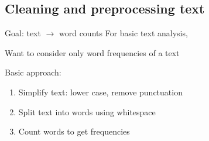 \documentclass[aspectratio=169,usenames,dvipsnames]{beamer}
\begin{document}
\subsection{Cleaning and preprocessing text}
\frame{\tableofcontents[currentsubsection]}

\begin{frame}{Goal: text $\rightarrow$ word counts}
    For basic text analysis,

    Want to consider only word frequencies of a text

    \vspace{1em}
    Basic approach:
    \begin{enumerate}
        \item Simplify text: lower case, remove punctuation
        \item Split text into words using whitespace
        \item Count words to get frequencies
    \end{enumerate}
\end{frame}
\end{document}
